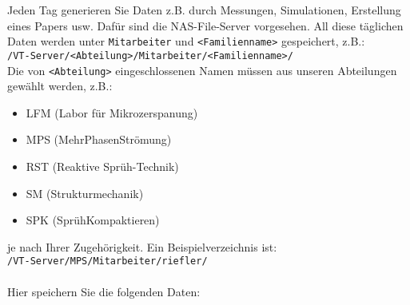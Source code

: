 Jeden Tag generieren Sie Daten z.B. durch Messungen, Simulationen, Erstellung
eines Papers usw. Dafür sind die NAS-File-Server vorgesehen. All diese täglichen
Daten werden unter \texttt{Mitarbeiter} und \texttt{<Familienname>} gespeichert,
z.B.: \\
\texttt{/VT-Server/<Abteilung>/Mitarbeiter/<Familienname>/} \\
Die von \texttt{<Abteilung>} eingeschlossenen Namen müssen aus unseren
Abteilungen gewählt werden, z.B.:
\begin{itemize}
  \item LFM (Labor für Mikrozerspanung)
  \item MPS (MehrPhasenStrömung)
  \item RST (Reaktive Sprüh-Technik)
  \item SM (Strukturmechanik)
  \item SPK (SprühKompaktieren)
\end{itemize}
je nach Ihrer Zugehörigkeit. Ein Beispielverzeichnis ist: \\
\texttt{/VT-Server/MPS/Mitarbeiter/riefler/} \\
\\
Hier speichern Sie die folgenden Daten:
